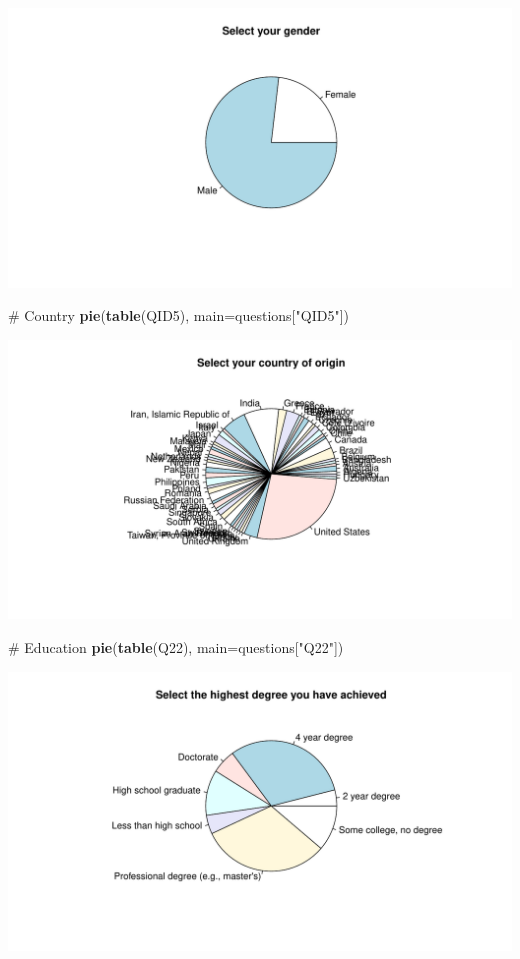 \documentclass[12pt, titlepage]{article}
\newenvironment{Shaded}{\begin{snugshade}}{\end{snugshade}}
\newcommand{\KeywordTok}[1]{\textcolor[rgb]{0.12,0.11,0.11}{\textbf{#1}}}
\newcommand{\DataTypeTok}[1]{\textcolor[rgb]{0.00,0.34,0.68}{#1}}
\newcommand{\StringTok}[1]{\textcolor[rgb]{0.75,0.01,0.01}{#1}}
\newcommand{\CommentTok}[1]{\textcolor[rgb]{0.54,0.53,0.53}{#1}}
\newcommand{\NormalTok}[1]{\textcolor[rgb]{0.12,0.11,0.11}{#1}}
\begin{document}
\includegraphics{report_survey_files/figure-latex/unnamed-chunk-2-2.pdf}

\begin{Shaded}
\begin{Highlighting}[]
\CommentTok{# Country}
\KeywordTok{pie}\NormalTok{(}\KeywordTok{table}\NormalTok{(QID5), }\DataTypeTok{main=}\NormalTok{questions[}\StringTok{"QID5"}\NormalTok{])}
\end{Highlighting}
\end{Shaded}

\includegraphics{report_survey_files/figure-latex/unnamed-chunk-2-3.pdf}

\begin{Shaded}
\begin{Highlighting}[]
\CommentTok{# Education}
\KeywordTok{pie}\NormalTok{(}\KeywordTok{table}\NormalTok{(Q22), }\DataTypeTok{main=}\NormalTok{questions[}\StringTok{"Q22"}\NormalTok{])}
\end{Highlighting}
\end{Shaded}

\includegraphics{report_survey_files/figure-latex/unnamed-chunk-2-4.pdf}
\end{document}
